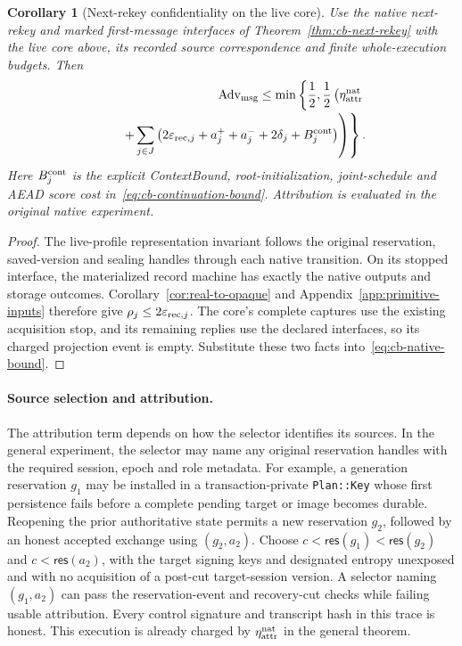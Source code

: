 \documentclass[pdflatex]{sn-jnl}
\theoremstyle{thmstyleone}
\newtheorem{corollary}[theorem]{Corollary}
\theoremstyle{thmstylethree}
\theoremstyle{thmstyletwo}
\begin{document}
\begin{corollary}[Next-rekey confidentiality on the live core]
\label{cor:live-core-next-rekey}
Use the native next-rekey and marked first-message interfaces of
Theorem~\ref{thm:cb-next-rekey} with the live core above, its recorded source
correspondence and finite whole-execution budgets. Then
\begin{equation}
\begin{split}
 \operatorname{Adv}_{\rm msg}\le\min\left\{\frac12,
 \frac12\left(\eta_{\rm attr}^{\rm nat}\right.\right.\\[-2pt]
 \left.\left.\qquad+
 \sum_{j\in J}\left(2\varepsilon_{{\rm rec},j}
      +a_j^++a_j^-+2\delta_j+B_j^{\rm cont}\right)
 \right)\right\}.
\end{split}
\label{eq:live-core-next-rekey}
\end{equation}
Here $B_j^{\rm cont}$ is the explicit ContextBound, root-initialization,
joint-schedule and AEAD score cost in~\eqref{eq:cb-continuation-bound}.
Attribution is evaluated in the original native experiment.
\end{corollary}
\begin{proof}
The live-profile representation invariant follows the original reservation,
saved-version and sealing handles through each native transition. On its
stopped interface, the materialized record machine has exactly the native
outputs and storage outcomes. Corollary~\ref{cor:real-to-opaque} and
Appendix~\ref{app:primitive-inputs} therefore give
$\rho_j\le2\varepsilon_{{\rm rec},j}$. The core's complete captures use
the existing acquisition stop, and its remaining replies use the declared
interfaces, so its charged projection event is empty. Substitute these two
facts into~\eqref{eq:cb-native-bound}.
\end{proof}

\paragraph{Source selection and attribution.}
The attribution term depends on how the selector identifies its sources.
In the general experiment, the selector may name any original reservation handles with
the required session, epoch and role metadata. For example, a generation
reservation $g_1$ may be installed in a transaction-private
\texttt{Plan::Key} whose first persistence fails before a complete pending
target or image becomes durable. Reopening the prior
authoritative state permits a new reservation $g_2$, followed by an honest
accepted exchange using $(g_2,a_2)$. Choose
$c<\mathsf{res}(g_1)<\mathsf{res}(g_2)$ and
$c<\mathsf{res}(a_2)$, with the target signing keys and designated entropy
unexposed and with no acquisition of a post-cut target-session version.
A selector naming $(g_1,a_2)$ can pass
the reservation-event and recovery-cut checks while failing usable
attribution. Every control signature and transcript hash in this trace is
honest. This execution is already charged by
$\eta_{\rm attr}^{\rm nat}$ in the general theorem.
\end{document}
